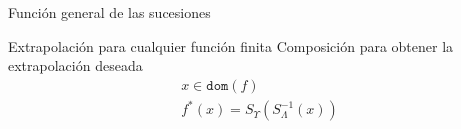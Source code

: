 \documentclass{beamer}
\begin{document}
\begin{frame}{Función general de las sucesiones}
\end{frame}

\begin{frame}{Extrapolación para cualquier función finita}
    Composición para obtener la extrapolación deseada
        \begin{gather*}
            x \in \texttt{dom}(f)\\
            f^{*}(x) = S_\Upsilon\left(S_\Lambda^{-1}(x)\right) 
        \end{gather*}
\end{frame}
\end{document}
